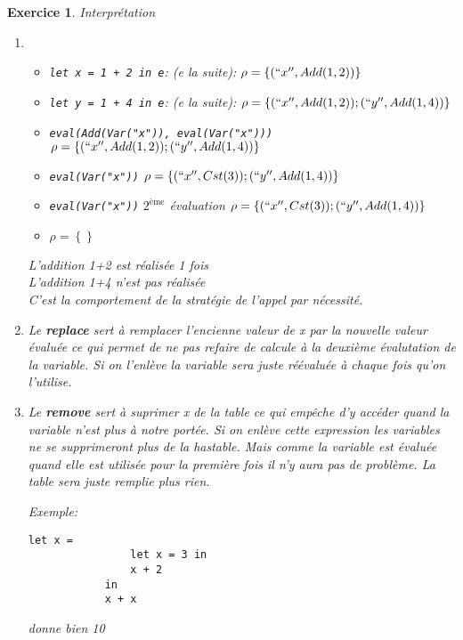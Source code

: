 \documentclass{article}
\theoremstyle{plain}
\newtheorem{exo}{Exercice}%
\begin{document}
\begin{exo} Interprétation
\begin{enumerate}
    \item \begin{itemize}
        \item \verb/let x = 1 + 2 in e/: (e la suite):
                $\rho = \left\{(``x'', Add(1, 2))\right\}$
        \item \verb/let y = 1 + 4 in e/: (e la suite):
        $\rho = \left\{(``x'', Add(1, 2)); (``y'', Add(1, 4))\right\}$
        \item \verb/eval(Add(Var("x")), eval(Var("x")))/ 
        $\rho = \left\{(``x'', Add(1, 2)); (``y'', Add(1, 4))\right\}$
        \item \verb/eval(Var("x"))/
        $\rho = \left\{(``x'', Cst(3)); (``y'', Add(1, 4))\right\}$
        \item \verb/eval(Var("x"))/ $2^{\text{ème}}$ évaluation
        $\rho = \left\{(``x'', Cst(3)); (``y'', Add(1, 4))\right\}$
        \item $\rho = \left\{\right\}$
    \end{itemize}
    L'addition 1+2 est réalisée 1 fois\\
    L'addition 1+4 n'est pas réalisée\\
    C'est la comportement de la stratégie de  \textit{l'appel par nécessité}.

    \item Le \textbf{replace} sert à remplacer l'encienne valeur de x 
        par la nouvelle valeur évaluée ce qui permet de ne pas refaire de calcule
        à la deuxième évalutation de la variable. Si on l'enlève la variable sera
        juste réévaluée à chaque fois qu'on l'utilise. 
    \newpage
    \item Le \textbf{remove} sert à suprimer x de la table ce qui empêche d'y 
        accéder quand la variable n'est plus à notre portée. 
        Si on enlève cette expression les variables ne se supprimeront plus de la hastable. 
        Mais comme la variable est évaluée quand elle est utilisée pour 
        la première fois il n’y aura pas de problème.
        La table sera juste remplie plus rien.
        
        Exemple:
        \begin{lstlisting}[frame = trBL]
            let x = 
                let x = 3 in
                x + 2
            in 
            x + x
        \end{lstlisting}
        donne bien 10


\end{enumerate}
\end{exo}
\end{document}
